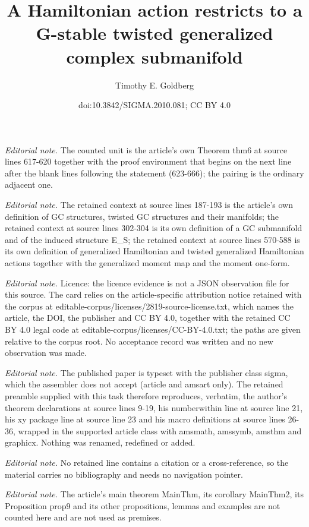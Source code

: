 \documentclass{article}
\title{A Hamiltonian action restricts to a G-stable twisted generalized complex submanifold}
\author{Timothy E. Goldberg}
\date{doi:10.3842/SIGMA.2010.081; CC BY 4.0}
\numberwithin{equation}{section}
\begin{document}
\maketitle
\noindent\textit{Editorial note.} The counted unit is the article's own Theorem thm6 at source lines 617-620 together with the proof environment that begins on the next line after the blank lines following the statement (623-666); the pairing is the ordinary adjacent one.\par\medskip
\noindent\textit{Editorial note.} The retained context at source lines 187-193 is the article's own definition of GC structures, twisted GC structures and their manifolds; the retained context at source lines 302-304 is its own definition of a GC submanifold and of the induced structure E\_S; the retained context at source lines 570-588 is its own definition of generalized Hamiltonian and twisted generalized Hamiltonian actions together with the generalized moment map and the moment one-form.\par\medskip
\noindent\textit{Editorial note.} Licence: the licence evidence is not a JSON observation file for this source. The card relies on the article-specific attribution notice retained with the corpus at editable-corpus/licenses/2819-source-license.txt, which names the article, the DOI, the publisher and CC BY 4.0, together with the retained CC BY 4.0 legal code at editable-corpus/licenses/CC-BY-4.0.txt; the paths are given relative to the corpus root. No acceptance record was written and no new observation was made.\par\medskip
\noindent\textit{Editorial note.} The published paper is typeset with the publisher class sigma, which the assembler does not accept (article and amsart only). The retained preamble supplied with this task therefore reproduces, verbatim, the author's theorem declarations at source lines 9-19, his numberwithin line at source line 21, his xy package line at source line 23 and his macro definitions at source lines 26-36, wrapped in the supported article class with amsmath, amssymb, amsthm and graphicx. Nothing was renamed, redefined or added.\par\medskip
\noindent\textit{Editorial note.} No retained line contains a citation or a cross-reference, so the material carries no bibliography and needs no navigation pointer.\par\medskip
\noindent\textit{Editorial note.} The article's main theorem MainThm, its corollary MainThm2, its Proposition prop9 and its other propositions, lemmas and examples are not counted here and are not used as premises.\par\medskip
\end{document}

